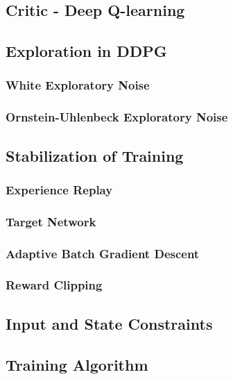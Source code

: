 \subsection{Critic - Deep Q-learning}

\newpage

\subsection{Exploration in DDPG}
\subsubsection{White Exploratory Noise}
\subsubsection{Ornstein-Uhlenbeck Exploratory Noise}
\subsection{Stabilization of Training}
\subsubsection{Experience Replay}
\subsubsection{Target Network}
\subsubsection{Adaptive Batch Gradient Descent}
\subsubsection{Reward Clipping}
\subsection{Input and State Constraints}
\subsection{Training Algorithm}

